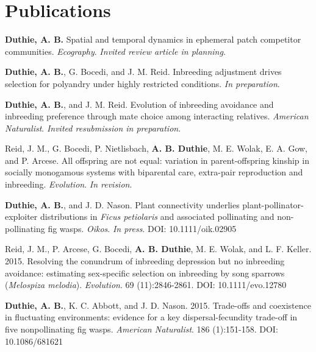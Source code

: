 \documentclass[letterpaper]{article}
\renewenvironment{itemize}{
  \begin{list}{}{
    \setlength{\leftmargin}{1.5em}
  }
}{
  \end{list}
}
\begin{document}
\section*{Publications}
\begin{itemize}
\item {\bf Duthie, A. B.} Spatial and temporal dynamics in ephemeral patch competitor communities. {\it Ecography}. {\it Invited review article in planning}.
\item {\bf Duthie, A. B.}, G. Bocedi, and J. M. Reid. Inbreeding adjustment drives selection for polyandry under highly restricted conditions. {\it In preparation}.
\item {\bf Duthie, A. B.}, and J. M. Reid. Evolution of inbreeding avoidance and inbreeding preference through mate choice among interacting relatives. {\it American Naturalist}. {\it Invited resubmission in preparation}.
\item Reid, J. M., G. Bocedi, P. Nietlisbach, {\bf A. B. Duthie}, M. E. Wolak, E. A. Gow, and P. Arcese. All offspring are not equal: variation in parent-offspring kinship in socially monogamous systems with biparental care, extra-pair reproduction and inbreeding. {\it Evolution}. {\it In revision}.
\item {\bf Duthie, A. B.}, and J. D. Nason. Plant connectivity underlies plant-pollinator-exploiter distributions in {\it Ficus petiolaris} and associated pollinating and non-pollinating fig wasps. {\it Oikos}. {\it In press}. DOI: 10.1111/oik.02905
\item Reid, J. M., P. Arcese, G. Bocedi, {\bf A. B. Duthie}, M. E. Wolak, and L. F. Keller. 2015. Resolving the conundrum of inbreeding depression but no inbreeding avoidance: estimating sex-specific selection on inbreeding by song sparrows ({\it Melospiza melodia}). {\it Evolution}. 69 (11):2846-2861. DOI: 10.1111/evo.12780
\item {\bf Duthie, A. B.}, K. C. Abbott, and J. D. Nason. 2015. Trade-offs and coexistence in fluctuating environments: evidence for a key dispersal-fecundity trade-off in five nonpollinating fig wasps. {\it American Naturalist}. 186 (1):151-158. DOI: 10.1086/681621

\end{itemize}
\end{document}
